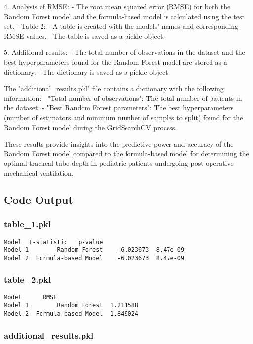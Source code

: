 \documentclass[11pt]{article}
\begin{document}
4. Analysis of RMSE:
   - The root mean squared error (RMSE) for both the Random Forest model and the formula-based model is calculated using the test set.
   - Table 2:
     - A table is created with the models' names and corresponding RMSE values.
     - The table is saved as a pickle object.

5. Additional results:
   - The total number of observations in the dataset and the best hyperparameters found for the Random Forest model are stored as a dictionary.
   - The dictionary is saved as a pickle object.

The "additional\_results.pkl" file contains a dictionary with the following information:
- "Total number of observations": The total number of patients in the dataset.
- "Best Random Forest parameters": The best hyperparameters (number of estimators and minimum number of samples to split) found for the Random Forest model during the GridSearchCV process.

These results provide insights into the predictive power and accuracy of the Random Forest model compared to the formula-based model for determining the optimal tracheal tube depth in pediatric patients undergoing post-operative mechanical ventilation.

\subsection{Code Output}

\subsubsection*{table\_1.pkl}

\begin{Verbatim}[tabsize=4]
                       Model  t-statistic   p-value
Model 1        Random Forest    -6.023673  8.47e-09
Model 2  Formula-based Model    -6.023673  8.47e-09
\end{Verbatim}

\subsubsection*{table\_2.pkl}

\begin{Verbatim}[tabsize=4]
                       Model      RMSE
Model 1        Random Forest  1.211588
Model 2  Formula-based Model  1.849024
\end{Verbatim}

\subsubsection*{additional\_results.pkl}
\end{document}
